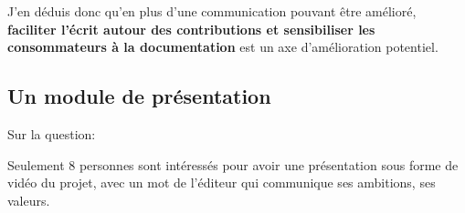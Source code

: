 			J'en déduis donc qu'en plus d'une communication pouvant être amélioré, \textbf{faciliter l'écrit autour des contributions et sensibiliser les consommateurs à la documentation} est un axe d'amélioration potentiel.

		\subsection{Un module de présentation}

			Sur la question:

			\begin{center}
				\textit{
				}
			\end{center}

			Seulement 8 personnes sont intéressés pour avoir une présentation sous forme de vidéo du projet, avec un mot de l'éditeur qui communique ses ambitions, ses valeurs.

